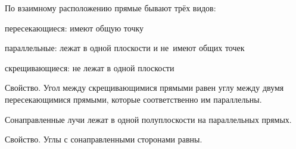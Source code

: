 {\ital По взаимному расположению} прямые бывают трёх видов:
\begin{list*}
\item{\bold пересекающиеся}: имеют {\ital общую точку}
\item{\bold параллельные}: {\ital лежат} в одной плоскости и {\ital не~имеют} общих точек
\item{\bold скрещивающиеся}: {\ital не лежат} в одной плоскости
\end{list*}
\begin{theorem}
{\bold Свойство.} Угол между скрещивающимися прямыми равен углу между двумя {\ital пересекающимися} прямыми, которые соответственно им параллельны.
\end{theorem}

{\bold Сонаправленные} {\ital лучи} лежат в одной полуплоскости на параллельных прямых.

\begin{theorem}
{\bold Свойство.} Углы с сонаправленными сторонами {\ital равны}.
\end{theorem} 
